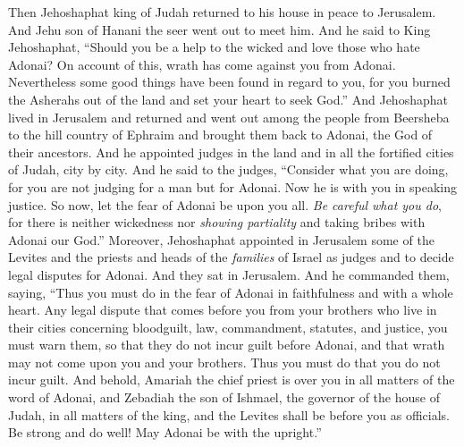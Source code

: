 \begin{biblechapter} %
 Then Jehoshaphat king of Judah returned to his house in peace to Jerusalem.
\verse And Jehu son of Hanani the seer went out to meet him. And he said to King Jehoshaphat, “Should you be a help to the wicked and love those who hate Adonai? On account of this, wrath has come against you from Adonai.
\verse Nevertheless some good things have been found in regard to you, for you burned the Asherahs out of the land and set your heart to seek God.”
\verse And Jehoshaphat lived in Jerusalem and returned and went out among the people from Beersheba to the hill country of Ephraim and brought them back to Adonai, the God of their ancestors.
\verse And he appointed judges in the land and in all the fortified cities of Judah, city by city.
\verse And he said to the judges, “Consider what you are doing, for you are not judging for a man but for Adonai. Now he is with you in speaking justice.
\verse So now, let the fear of Adonai be upon you all. \textit{Be careful what you do}, for there is neither wickedness nor \textit{showing partiality} and taking bribes with Adonai our God.”
\verse Moreover, Jehoshaphat appointed in Jerusalem some of the Levites and the priests and heads of the \textit{families} of Israel as judges and to decide legal disputes for Adonai. And they sat in Jerusalem.
\verse And he commanded them, saying, “Thus you must do in the fear of Adonai in faithfulness and with a whole heart.
\verse Any legal dispute that comes before you from your brothers who live in their cities concerning bloodguilt, law, commandment, statutes, and justice, you must warn them, so that they do not incur guilt before Adonai, and that wrath may not come upon you and your brothers. Thus you must do that you do not incur guilt.
\verse And behold, Amariah the chief priest is over you in all matters of the word of Adonai, and Zebadiah the son of Ishmael, the governor of the house of Judah, in all matters of the king, and the Levites shall be before you as officials. Be strong and do well! May Adonai be with the upright.”
\end{biblechapter}

